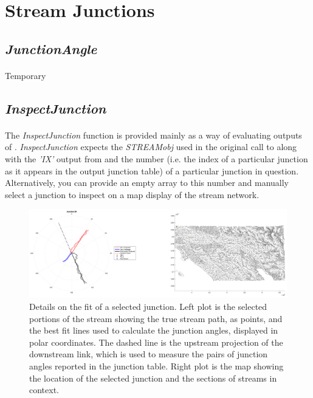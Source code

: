 \section{Stream Junctions}
\subsection{\textit{JunctionAngle}} \label{sec:JAngle}
\paragraph{}Temporary

\subsection{\textit{InspectJunction}}
\paragraph{}The \textit{InspectJunction} function is provided mainly as a way of evaluating outputs of . \textit{InspectJunction} expects the \textit{STREAMobj} used in the original call to  along with the \textit{'IX'} output from  and the number (i.e. the index of a particular junction as it appears in the output junction table) of a particular junction in question. Alternatively, you can provide an empty array to this number and manually select a junction to inspect on a map display of the stream network. 

\begin{figure}[H]
	\centering
	\includegraphics[width=16.5cm]{PNGs/InspectJunct.png}
	\caption{Details on the fit of a selected junction. Left plot is the selected portions of the stream showing the true stream path, as points, and the best fit lines used to calculate the junction angles, displayed in polar coordinates. The dashed line is the upstream projection of the downstream link, which is used to measure the pairs of junction angles reported in the junction table. Right plot is the map showing the location of the selected junction and the sections of streams in context.} 
	\label{fig:InspectJunc}
\end{figure}

